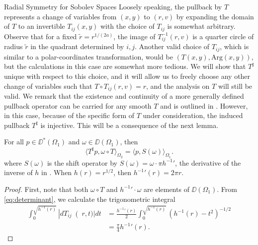 \begin{chapter}{Radial Symmetry for Sobolev Spaces}
Loosely speaking, the pullback by $T$ represents a change of variables from $(x,y)$ to $(r,v)$ by expanding the domain of $T$ to an invertible $T_{ij}(x,y)$ with the choice of $T_{ij}$ is somewhat arbitrary.  
Observe that for a fixed $\tilde r = r^{1/(2a)}$, the image of $T_{ij}^{-1}(r,v)$ is a quarter circle of radius $\tilde r$ in the quadrant determined by $i,j$.
Another valid choice of $T_{ij}$, which is similar to a polar-coordinates transformation, would be $(T(x,y), \mathrm{Arg}(x,y))$, but the calculations in this case are somewhat more tedious.
We will show that $T^\sharp$ unique with respect to this choice, and it will allow us to freely choose any other change of variables such that $T \circ T_{ij}(r,v) = r$, and the analysis on $T$ will still be valid.
We remark that the existence and continuity of a more generally defined pullback operator can be carried for any smooth $T$ and is outlined in \citep{hormander1983}.
However, in this case, because of the specific form of $T$ under consideration, the induced pullback $T^\sharp$ is injective. 
This will be a consequence of the next lemma.
\begin{lem} \label{lem:innerProduct}
  For all $p\in\DD^*(\Omega_1)$ and $\omega \in \DD(\Omega_1)$, then 
  \begin{equation}
    \langle T^\sharp p , \omega \circ T \rangle_{\Omega_2} = \langle p,S(\omega)\rangle_{\Omega_1}.
  \end{equation}
  where $S(\omega)$ is the shift operator by $S(\omega) = \omega\cdot\pi {h^{-1}}'$, the derivative of the inverse of $h$ in . 
  When $h(r) = r^{1/2}$, then ${h^{-1}}'(r) = 2\pi r$.
\end{lem}
\begin{proof}
  First, note that both $\omega \circ T$ and ${h^{-1}}'\cdot \omega$ are elements of $\DD(\Omega_1)$.  
  From \eqref{eq:determinant}, we calculate the trigonometric integral
  \begin{align}
    \int_0^{\sqrt{h^{-1}(r)}} \left|dT_{ij}\right(r,t)| dt 
    &= \frac{{h^{-1}}'(r)}2 \int_0^{\sqrt{h^{-1}(r)}}\left(h^{-1}(r) - t^2\right)^{-1/2}\nonumber\\
    &= \frac\pi4 {h^{-1}}'(r).

\end{align}
\end{proof}
\end{chapter}
